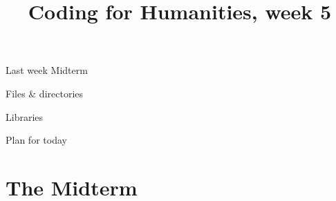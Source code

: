 \documentclass[aspectratio=169,usenames,dvipsnames]{beamer}
\title{Coding for Humanities, week 5}
\begin{document}
\begin{frame}
 \titlepage
\end{frame}

\begin{frame}{Last week}
    Midterm
    
    \vspace{1em}
    Files \& directories

    \vspace{1em}
    Libraries
\end{frame}

\begin{frame}{Plan for today}
 \tableofcontents
\end{frame}

\section{The Midterm}
\end{document}
